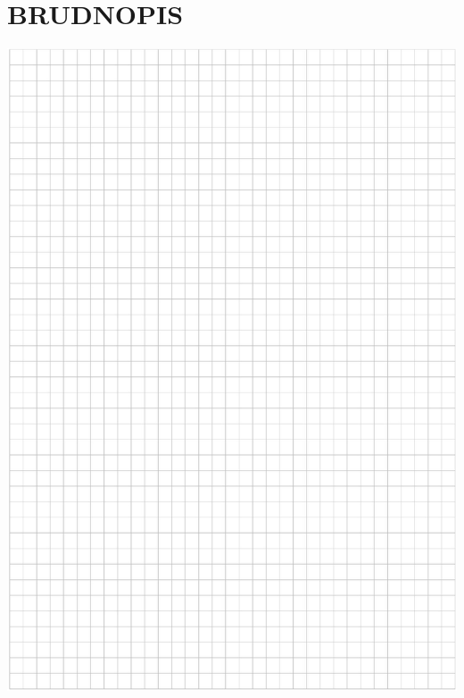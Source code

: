 \documentclass[10pt]{article}
\begin{document}
\section*{BRUDNOPIS}
\begin{center}
\includegraphics[max width=\textwidth]{2024_11_21_b8ac5f500a5bbb1b4ec5g-03}
\end{center}
\end{document}
